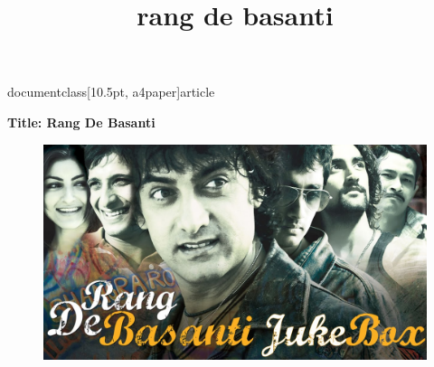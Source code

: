 documentclass[10.5pt, a4paper]{article}
\usepackage{amsfonts}
\usepackage[top=0.3in,left=0.2in,right=0.2in]{geometry}
\usepackage{times}
\usepackage{tabularx}
\usepackage{graphicx}
\title{rang de basanti}

\maketitle
\textbf{Title: Rang De Basanti}
\begin{figure}
\includegraphics{pic.jpg}
\end{figure}

